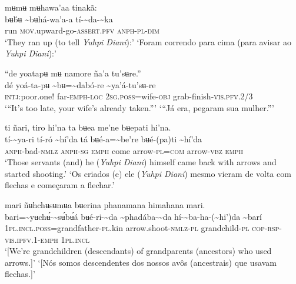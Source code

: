 \documentclass[output=paper,
modfonts,nonflat
]{langsci/langscibook}
\begin{document}
\ea mʉmʉ mʉhawa'aa tinakã:\\[.3em]
\gll {\textasciitilde}bʉb́ʉ	{\textasciitilde}bʉhá-wa'a-a	tí-{\textasciitilde}da-{\textasciitilde}ka\\
     run	\textsc{mov.}upward-go-\textsc{assert.pfv}	\textsc{anph-pl-dim}\\
\glt ‘They ran up (to tell \textit{Yuhpi Diani}):’
\glt ‘Foram correndo para cima (para avisar ao \textit{Yuhpi Diani}):’
\z 

\ea “de yoatapʉ mʉ namore ña'a tu'sʉre.”\\[.3em]
\gll dé	yoá-ta-pʉ	{\textasciitilde}bʉ={\textasciitilde}dabó-re	{\textasciitilde}ya'á-tu'sʉ-re\\
     \textsc{intj:}poor.one!	far-\textsc{emph-loc}	2\textsc{sg.poss}=wife\textsc{-obj}	grab-finish-\textsc{vis.pfv.}2/3\\
\glt ‘“It’s too late, your wife's already taken.”’
\glt ‘“Já era, pegaram sua mulher.”’ 
\z 

\ea ti ñari, tiro hi'na ta bʉea me'ne bʉepati hi'na.\\[.3em]
\gll tí-{\textasciitilde}ya-ri	tí-ró	{\textasciitilde}hí'da	tá	bʉé-a={\textasciitilde}be're	bʉé-(pa)ti{\footnotemark}	{\textasciitilde}hí'da\\
     \textsc{anph}-bad-\textsc{nmlz}	\textsc{anph-sg}	\textsc{emph}	come	arrow-\textsc{pl=com}	arrow-\textsc{vbz}	\textsc{emph}\\
\glt ‘Those servants (and) he (\textit{Yuhpi Diani}) himself came back with arrows and started shooting.’
\glt ‘Os criados (e) ele (\textit{Yuhpi Diani}) mesmo vieram de volta com flechas e começaram a flechar.’
\z

\newpage 
\ea mari ñʉhchʉsʉmʉa bʉerina phanamana himahana mari.\\[.3em]
\gll {\textasciitilde}bari={\textasciitilde}yʉchʉ́-{\textasciitilde}sʉ́bʉ́á	bʉé-ri-{\textasciitilde}da	{\textasciitilde}phadába-{\textasciitilde}da	hí-{\textasciitilde}ba-ha-({\textasciitilde}hi')da	{\textasciitilde}barí{\footnotemark}\\
     1\textsc{pl.incl.poss}=grandfather-\textsc{pl.}kin	arrow.shoot-\textsc{nmlz-pl}	grandchild-\textsc{pl}	\textsc{cop-rsp}-\textsc{vis.ipfv.1-emph}	1\textsc{pl.incl}\\
\glt  ‘[We're grandchildren (descendants) of grandparents (ancestors) who used arrows.]’
\glt ‘[Nós somos descendentes dos nossos avôs (ancestrais) que usavam flechas.]’ 
\z 
\end{document}
